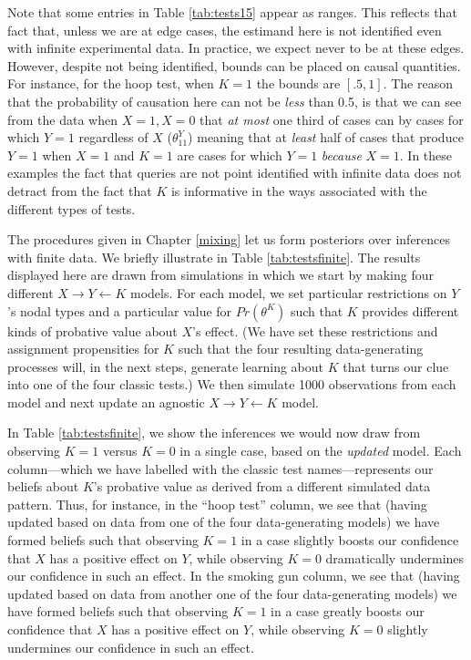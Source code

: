 \documentclass[
  12pt,
]{book}
\begin{document}
Note that some entries in Table \ref{tab:tests15} appear as ranges. This reflects that fact that, unless we are at edge cases, the estimand here is not identified even with infinite experimental data. In practice, we expect never to be at these edges. However, despite not being identified, bounds can be placed on causal quantities. For instance, for the hoop test, when \(K=1\) the bounds are \([.5,1]\). The reason that the probability of causation here can not be \emph{less} than 0.5, is that we can see from the data when \(X=1, X=0\) that \emph{at most} one third of cases can by cases for which \(Y=1\) regardless of \(X\) (\(\theta^Y_{11}\)) meaning that at \emph{least} half of cases that produce \(Y=1\) when \(X=1\) and \(K=1\) are cases for which \(Y=1\) \emph{because} \(X=1\). In these examples the fact that queries are not point identified with infinite data does not detract from the fact that \(K\) is informative in the ways associated with the different types of tests.

The procedures given in Chapter \ref{mixing} let us form posteriors over inferences with finite data. We briefly illustrate in Table \ref{tab:testsfinite}. The results displayed here are drawn from simulations in which we start by making four different \(X \rightarrow Y \leftarrow K\) models. For each model, we set particular restrictions on \(Y\)'s nodal types and a particular value for \(Pr(\theta^K)\) such that \(K\) provides different kinds of probative value about \(X\)'s effect. (We have set these restrictions and assignment propensities for \(K\) such that the four resulting data-generating processes will, in the next steps, generate learning about \(K\) that turns our clue into one of the four classic tests.) We then simulate 1000 observations from each model and next update an agnostic \(X \rightarrow Y \leftarrow K\) model.

In Table \ref{tab:testsfinite}, we show the inferences we would now draw from observing \(K=1\) versus \(K=0\) in a single case, based on the \emph{updated} model. Each column---which we have labelled with the classic test names---represents our beliefs about \(K\)'s probative value as derived from a different simulated data pattern. Thus, for instance, in the ``hoop test'' column, we see that (having updated based on data from one of the four data-generating models) we have formed beliefs such that observing \(K=1\) in a case slightly boosts our confidence that \(X\) has a positive effect on \(Y\), while observing \(K=0\) dramatically undermines our confidence in such an effect. In the smoking gun column, we see that (having updated based on data from another one of the four data-generating models) we have formed beliefs such that observing \(K=1\) in a case greatly boosts our confidence that \(X\) has a positive effect on \(Y\), while observing \(K=0\) slightly undermines our confidence in such an effect.
\end{document}
